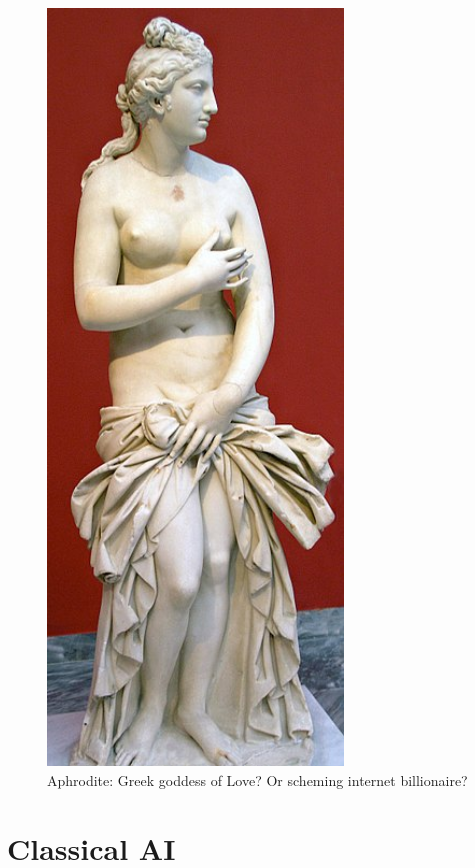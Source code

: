 \documentclass[a4paper]{caesar_book}
\begin{document}
\begin{figure}[htbp]%
	\includegraphics[width=0.7\textwidth,keepaspectratio]{pictures/NAMA_Aphrodite_Syracuse.jpg}%
	\caption*{Aphrodite: Greek goddess of Love? Or scheming internet billionaire?}%
	\label{aphrodite}%
\end{figure}%

\section{Classical AI}
\end{document}
